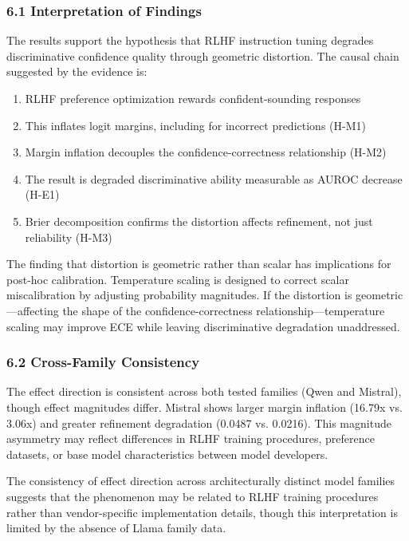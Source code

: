 
\subsubsection{6.1 Interpretation of Findings}

The results support the hypothesis that RLHF instruction tuning degrades discriminative confidence quality through geometric distortion. The causal chain suggested by the evidence is:

\begin{enumerate}
\item RLHF preference optimization rewards confident-sounding responses
\item This inflates logit margins, including for incorrect predictions (H-M1)
\item Margin inflation decouples the confidence-correctness relationship (H-M2)
\item The result is degraded discriminative ability measurable as AUROC decrease (H-E1)
\item Brier decomposition confirms the distortion affects refinement, not just reliability (H-M3)
\end{enumerate}

The finding that distortion is geometric rather than scalar has implications for post-hoc calibration. Temperature scaling is designed to correct scalar miscalibration by adjusting probability magnitudes. If the distortion is geometric---affecting the shape of the confidence-correctness relationship---temperature scaling may improve ECE while leaving discriminative degradation unaddressed.

\subsubsection{6.2 Cross-Family Consistency}

The effect direction is consistent across both tested families (Qwen and Mistral), though effect magnitudes differ. Mistral shows larger margin inflation (16.79x vs. 3.06x) and greater refinement degradation (0.0487 vs. 0.0216). This magnitude asymmetry may reflect differences in RLHF training procedures, preference datasets, or base model characteristics between model developers.

The consistency of effect direction across architecturally distinct model families suggests that the phenomenon may be related to RLHF training procedures rather than vendor-specific implementation details, though this interpretation is limited by the absence of Llama family data.

